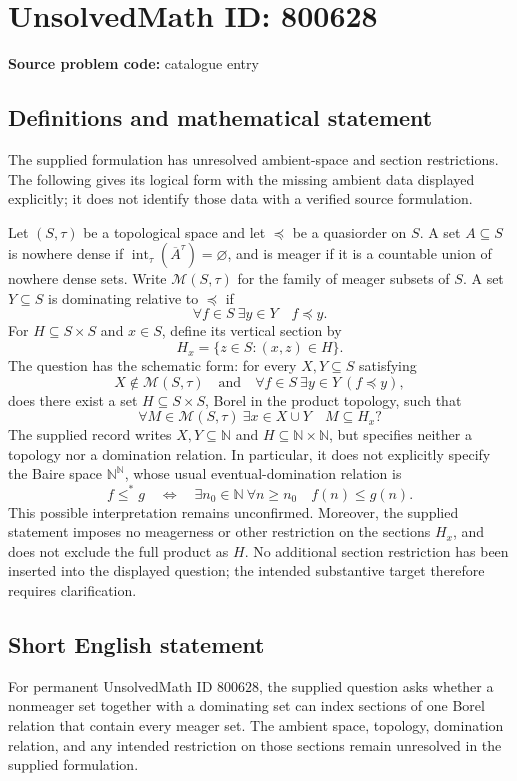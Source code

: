\documentclass[11pt]{article}
\begin{document}
\section*{UnsolvedMath ID: 800628}
\textbf{Source problem code:} catalogue entry
\subsection{Definitions and mathematical statement}
The supplied formulation has unresolved ambient-space and section restrictions. The following gives its logical form with the missing ambient data displayed explicitly; it does not identify those data with a verified source formulation.

Let \((S,\tau)\) be a topological space and let \(\preceq\) be a quasiorder on \(S\). A set \(A\subseteq S\) is nowhere dense if \(\operatorname{int}_{\tau}(\overline{A}^{\tau})=\varnothing\), and is meager if it is a countable union of nowhere dense sets. Write \(\mathcal M(S,\tau)\) for the family of meager subsets of \(S\). A set \(Y\subseteq S\) is dominating relative to \(\preceq\) if
\[
\forall f\in S\ \exists y\in Y\quad f\preceq y.
\]
For \(H\subseteq S\times S\) and \(x\in S\), define its vertical section by
\[
H_x=\{z\in S:(x,z)\in H\}.
\]
The question has the schematic form: for every \(X,Y\subseteq S\) satisfying
\[
X\notin\mathcal M(S,\tau)
\quad\text{and}\quad
\forall f\in S\ \exists y\in Y\ (f\preceq y),
\]
does there exist a set \(H\subseteq S\times S\), Borel in the product topology, such that
\[
\forall M\in\mathcal M(S,\tau)\ \exists x\in X\cup Y\quad M\subseteq H_x?
\]
The supplied record writes \(X,Y\subseteq\mathbb N\) and \(H\subseteq\mathbb N\times\mathbb N\), but specifies neither a topology nor a domination relation. In particular, it does not explicitly specify the Baire space \(\mathbb N^{\mathbb N}\), whose usual eventual-domination relation is
\[
f\leq^{*}g
\quad\Longleftrightarrow\quad
\exists n_0\in\mathbb N\ \forall n\geq n_0\quad f(n)\leq g(n).
\]
This possible interpretation remains unconfirmed. Moreover, the supplied statement imposes no meagerness or other restriction on the sections \(H_x\), and does not exclude the full product as \(H\). No additional section restriction has been inserted into the displayed question; the intended substantive target therefore requires clarification.
\subsection{Short English statement}
For permanent UnsolvedMath ID \(800628\), the supplied question asks whether a nonmeager set together with a dominating set can index sections of one Borel relation that contain every meager set. The ambient space, topology, domination relation, and any intended restriction on those sections remain unresolved in the supplied formulation.
\end{document}
